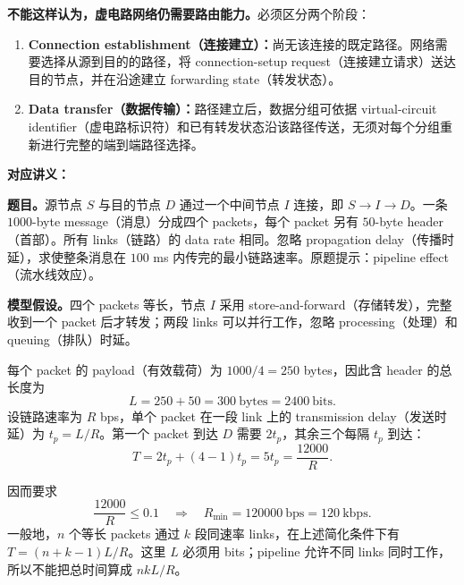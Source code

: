 \begin{checkedsolution}
\textbf{不能这样认为，虚电路网络仍需要路由能力。}必须区分两个阶段：
\begin{enumerate}[label=(\arabic*),itemsep=0pt,topsep=0pt]
  \item \textbf{Connection establishment（连接建立）：}尚无该连接的既定路径。网络需要选择从源到目的的路径，将 connection-setup request（连接建立请求）送达目的节点，并在沿途建立 forwarding state（转发状态）。
  \item \textbf{Data transfer（数据传输）：}路径建立后，数据分组可依据 virtual-circuit identifier（虚电路标识符）和已有转发状态沿该路径传送，无须对每个分组重新进行完整的端到端路径选择。
\end{enumerate}
\end{checkedsolution}


\textbf{对应讲义：}

\textbf{题目。}源节点 $S$ 与目的节点 $D$ 通过一个中间节点 $I$ 连接，即 $S\to I\to D$。一条 $1000$-byte message（消息）分成四个 packets，每个 packet 另有 $50$-byte header（首部）。所有 links（链路）的 data rate 相同。忽略 propagation delay（传播时延），求使整条消息在 $100$ ms 内传完的最小链路速率。原题提示：pipeline effect（流水线效应）。

\textbf{模型假设。}四个 packets 等长，节点 $I$ 采用 store-and-forward（存储转发），完整收到一个 packet 后才转发；两段 links 可以并行工作，忽略 processing（处理）和 queuing（排队）时延。

\begin{checkedsolution}
每个 packet 的 payload（有效载荷）为 $1000/4=250$ bytes，因此含 header 的总长度为
\[
  L=250+50=300\ \mathrm{bytes}=2400\ \mathrm{bits}.
\]
设链路速率为 $R$ bps，单个 packet 在一段 link 上的 transmission delay（发送时延）为 $t_p=L/R$。第一个 packet 到达 $D$ 需要 $2t_p$，其余三个每隔 $t_p$ 到达：
\[
  T=2t_p+(4-1)t_p=5t_p=\frac{12000}{R}.
\]

\begin{center}
  
\end{center}

因而要求
\[
  \frac{12000}{R}\le0.1
  \quad\Longrightarrow\quad
  \boxed{R_{\min}=120000\ \mathrm{bps}=120\ \mathrm{kbps}}.
\]
一般地，$n$ 个等长 packets 通过 $k$ 段同速率 links，在上述简化条件下有 $T=(n+k-1)L/R$。这里 $L$ 必须用 bits；pipeline 允许不同 links 同时工作，所以不能把总时间算成 $nkL/R$。
\end{checkedsolution}

